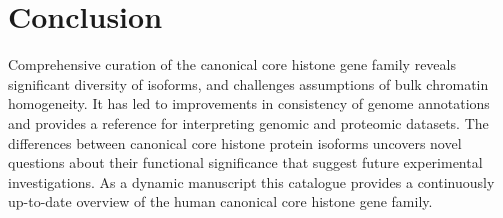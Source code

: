\section{Conclusion}

  Comprehensive curation of the canonical core histone gene family
  reveals significant diversity of isoforms,
  and challenges assumptions of bulk chromatin homogeneity.
  It has led to improvements in consistency of genome annotations
  and provides a reference for interpreting genomic and proteomic datasets.
  The differences between canonical core histone protein isoforms
  uncovers novel questions about their functional significance
  that suggest future experimental investigations.
  As a dynamic manuscript this catalogue provides a continuously up-to-date overview
  of the human canonical core histone gene family.
